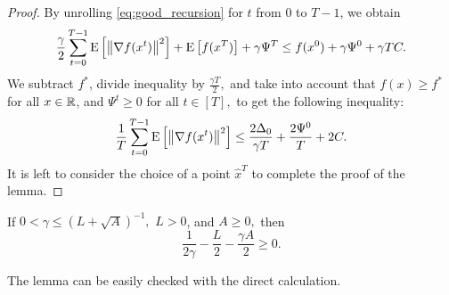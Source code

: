 \documentclass{article}
\begin{document}
\begin{proof}
  By unrolling \eqref{eq:good_recursion} for $t$ from $0$ to $T - 1$, we obtain
  \begin{align*}
      \frac{\gamma}{2}\sum_{t = 0}^{T - 1}{\rm E}\left[\left\| \nabla f(x^t) \right\|^2\right] + {\rm E}\left[f(x^{T})\right] + \gamma \Psi^{T} \leq f(x^0) + \gamma \Psi^{0} + \gamma T C.
  \end{align*}
  We subtract $f^*$, divide inequality by $\frac{\gamma T}{2},$ and take into account that $f(x) \geq f^*$ for all $x \in \mathbb{R}$, and $\Psi^{t} \geq 0$ for all $t \in [T],$ to get the following inequality:
  \begin{align*}
      \frac{1}{T}\sum_{t = 0}^{T - 1}{\rm E}\left[\left\| \nabla f(x^t) \right\|^2\right] \leq \frac{2 \Delta_0}{\gamma T} + \frac{2\Psi^{0}}{T} + 2 C.
  \end{align*}
  It is left to consider the choice of a point $\widehat{x}^T$ to complete the proof of the lemma.
\end{proof}

\begin{lemma}
  \label{lemma:gamma}
  If $0 < \gamma \leq (L + \sqrt{A})^{-1},$ $L > 0$, and $A \geq 0,$ then $$\frac{1}{2\gamma} - \frac{L}{2} - \frac{\gamma A}{2} \geq 0.$$
\end{lemma}
The lemma can be easily checked with the direct calculation.
\end{document}
